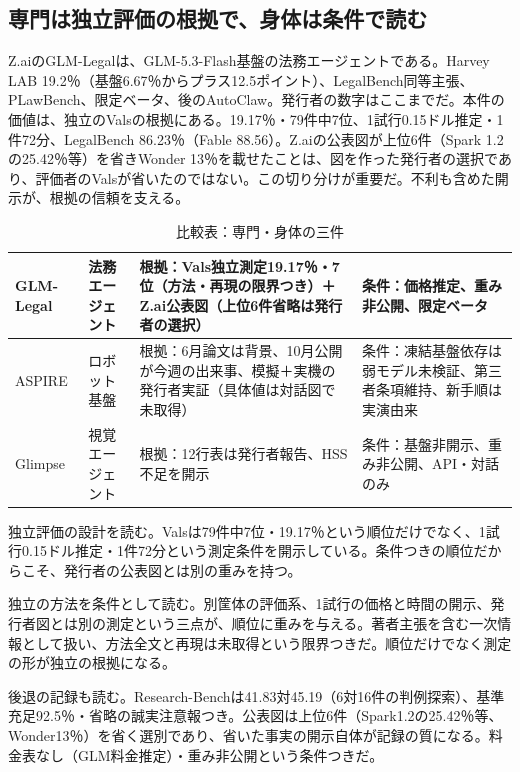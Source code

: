 \documentclass[lualatex,a4paper,10pt]{jlreq}
\begin{document}
\subsection*{専門は独立評価の根拠で、身体は条件で読む}

Z.aiのGLM-Legalは、GLM-5.3-Flash基盤の法務エージェントである。Harvey LAB 19.2％（基盤6.67％からプラス12.5ポイント）、LegalBench同等主張、PLawBench、限定ベータ、後のAutoClaw。発行者の数字はここまでだ。本件の価値は、独立のValsの根拠にある。19.17％・79件中7位、1試行0.15ドル推定・1件72分、LegalBench 86.23％（Fable 88.56）。Z.aiの公表図が上位6件（Spark 1.2の25.42％等）を省きWonder 13％を載せたことは、図を作った発行者の選択であり、評価者のValsが省いたのではない。この切り分けが重要だ。不利も含めた開示が、根拠の信頼を支える。
\cite{B55,B53,B54}

\begin{table}[htbp]\centering\footnotesize
\caption{比較表：専門・身体の三件}
\begin{tabularx}{0.96\linewidth}{@{}lXXX@{}}
\toprule
GLM-Legal & 法務エージェント & 根拠：Vals独立測定19.17％・7位（方法・再現の限界つき）＋Z.ai公表図（上位6件省略は発行者の選択） & 条件：価格推定、重み非公開、限定ベータ \cite{B55,B53,B54} \\
\midrule
ASPIRE & ロボット基盤 & 根拠：6月論文は背景、10月公開が今週の出来事、模擬＋実機の発行者実証（具体値は対話図で未取得） & 条件：凍結基盤依存は弱モデル未検証、第三者条項維持、新手順は実演由来 \cite{B57,B56,B89} \\
\midrule
Glimpse & 視覚エージェント & 根拠：12行表は発行者報告、HSS不足を開示 & 条件：基盤非開示、重み非公開、API・対話のみ \cite{B58,B59,B88} \\
\bottomrule
\end{tabularx}
\end{table}


独立評価の設計を読む。Valsは79件中7位・19.17％という順位だけでなく、1試行0.15ドル推定・1件72分という測定条件を開示している。条件つきの順位だからこそ、発行者の公表図とは別の重みを持つ。
\cite{B55,B53,B54}


独立の方法を条件として読む。別筐体の評価系、1試行の価格と時間の開示、発行者図とは別の測定という三点が、順位に重みを与える。著者主張を含む一次情報として扱い、方法全文と再現は未取得という限界つきだ。順位だけでなく測定の形が独立の根拠になる。
\cite{B55,B53,B54}


後退の記録も読む。Research-Benchは41.83対45.19（6対16件の判例探索）、基準充足92.5％・省略の誠実注意報つき。公表図は上位6件（Spark1.2の25.42％等、Wonder13％）を省く選別であり、省いた事実の開示自体が記録の質になる。料金表なし（GLM料金推定）・重み非公開という条件つきだ。
\cite{B55,B53,B54}
\end{document}
